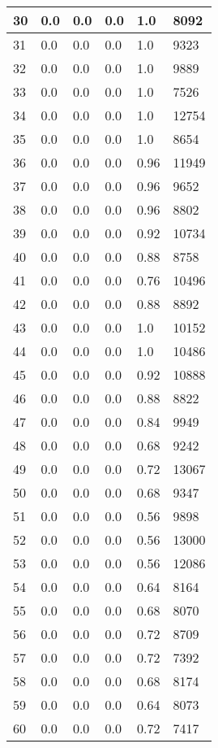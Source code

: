 \begin{longtable}{|l|l|l|l|l|l|}
30 & 0.0 & 0.0 & 0.0 & 1.0 & 8092 \\ \hline 
31 & 0.0 & 0.0 & 0.0 & 1.0 & 9323 \\ \hline 
32 & 0.0 & 0.0 & 0.0 & 1.0 & 9889 \\ \hline 
33 & 0.0 & 0.0 & 0.0 & 1.0 & 7526 \\ \hline 
34 & 0.0 & 0.0 & 0.0 & 1.0 & 12754 \\ \hline 
35 & 0.0 & 0.0 & 0.0 & 1.0 & 8654 \\ \hline 
36 & 0.0 & 0.0 & 0.0 & 0.96 & 11949 \\ \hline 
37 & 0.0 & 0.0 & 0.0 & 0.96 & 9652 \\ \hline 
38 & 0.0 & 0.0 & 0.0 & 0.96 & 8802 \\ \hline 
39 & 0.0 & 0.0 & 0.0 & 0.92 & 10734 \\ \hline 
40 & 0.0 & 0.0 & 0.0 & 0.88 & 8758 \\ \hline 
41 & 0.0 & 0.0 & 0.0 & 0.76 & 10496 \\ \hline 
42 & 0.0 & 0.0 & 0.0 & 0.88 & 8892 \\ \hline 
43 & 0.0 & 0.0 & 0.0 & 1.0 & 10152 \\ \hline 
44 & 0.0 & 0.0 & 0.0 & 1.0 & 10486 \\ \hline 
45 & 0.0 & 0.0 & 0.0 & 0.92 & 10888 \\ \hline 
46 & 0.0 & 0.0 & 0.0 & 0.88 & 8822 \\ \hline 
47 & 0.0 & 0.0 & 0.0 & 0.84 & 9949 \\ \hline 
48 & 0.0 & 0.0 & 0.0 & 0.68 & 9242 \\ \hline 
49 & 0.0 & 0.0 & 0.0 & 0.72 & 13067 \\ \hline 
50 & 0.0 & 0.0 & 0.0 & 0.68 & 9347 \\ \hline 
51 & 0.0 & 0.0 & 0.0 & 0.56 & 9898 \\ \hline 
52 & 0.0 & 0.0 & 0.0 & 0.56 & 13000 \\ \hline 
53 & 0.0 & 0.0 & 0.0 & 0.56 & 12086 \\ \hline 
54 & 0.0 & 0.0 & 0.0 & 0.64 & 8164 \\ \hline 
55 & 0.0 & 0.0 & 0.0 & 0.68 & 8070 \\ \hline 
56 & 0.0 & 0.0 & 0.0 & 0.72 & 8709 \\ \hline 
57 & 0.0 & 0.0 & 0.0 & 0.72 & 7392 \\ \hline 
58 & 0.0 & 0.0 & 0.0 & 0.68 & 8174 \\ \hline 
59 & 0.0 & 0.0 & 0.0 & 0.64 & 8073 \\ \hline 
60 & 0.0 & 0.0 & 0.0 & 0.72 & 7417 \\ \hline 

\end{longtable}
